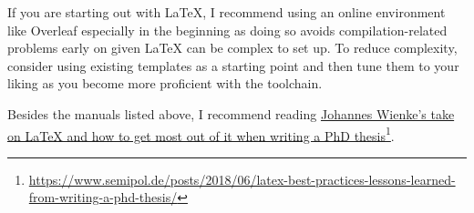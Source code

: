 If you are starting out with LaTeX, I recommend using an online environment like Overleaf especially in the beginning as doing so avoids compilation-related problems early on given LaTeX can be complex to set up.
To reduce complexity, consider using existing templates as a starting point and then tune them to your liking as you become more proficient with the toolchain.

Besides the manuals listed above, I recommend reading \href{https://www.semipol.de/posts/2018/06/latex-best-practices-lessons-learned-from-writing-a-phd-thesis/}{Johannes Wienke's take on LaTeX and how to get most out of it when writing a PhD thesis}\footnote{\url{https://www.semipol.de/posts/2018/06/latex-best-practices-lessons-learned-from-writing-a-phd-thesis/}}.
